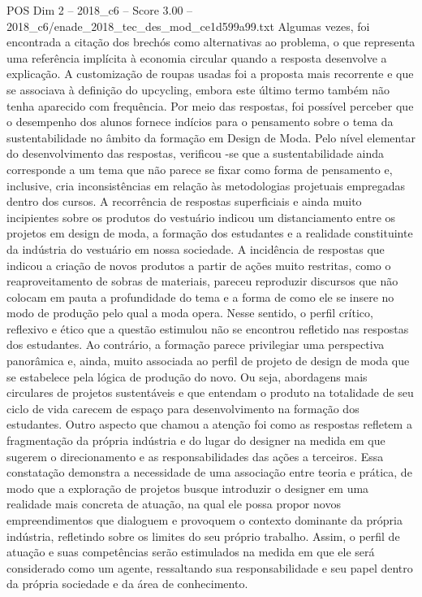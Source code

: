 \begin{textsample}{POS Dim 2 – 2018\_c6 – Score 3.00 – 2018\_c6/enade\_2018\_tec\_des\_mod\_ce1d599a99.txt}
Algumas vezes, foi encontrada a citação dos brechós como alternativas ao problema, o que representa uma referência implícita à economia circular quando a resposta desenvolve a explicação.
A customização de roupas usadas foi a proposta mais recorrente e que se associava à definição do upcycling, embora este último termo também não tenha aparecido com frequência.
Por meio das respostas, foi possível perceber que o desempenho dos alunos fornece indícios para o pensamento sobre o tema da sustentabilidade no âmbito da formação em Design de Moda.
Pelo nível elementar do desenvolvimento das respostas, verificou -se que a sustentabilidade ainda corresponde a um tema que não parece se fixar como forma de pensamento e, inclusive, cria inconsistências em relação às metodologias projetuais empregadas dentro dos cursos.
A recorrência de respostas superficiais e ainda muito incipientes sobre os produtos do vestuário indicou um distanciamento entre os projetos em design de moda, a formação dos estudantes e a realidade constituinte da indústria do vestuário em nossa sociedade.
A incidência de respostas que indicou a criação de novos produtos a partir de ações muito restritas, como o reaproveitamento de sobras de materiais, pareceu reproduzir discursos que não colocam em pauta a profundidade do tema e a forma de como ele se insere no modo de produção pelo qual a moda opera.
Nesse sentido, o perfil crítico, reflexivo e ético que a questão estimulou não se encontrou refletido nas respostas dos estudantes.
Ao contrário, a formação parece privilegiar uma perspectiva panorâmica e, ainda, muito associada ao perfil de projeto de design de moda que se estabelece pela lógica de produção do novo.
Ou seja, abordagens mais circulares de projetos sustentáveis e que entendam o produto na totalidade de seu ciclo de vida carecem de espaço para desenvolvimento na formação dos estudantes.
Outro aspecto que chamou a atenção foi como as respostas refletem a fragmentação da própria indústria e do lugar do designer na medida em que sugerem o direcionamento e as responsabilidades das ações a terceiros.
Essa constatação demonstra a necessidade de uma associação entre teoria e prática, de modo que a exploração de projetos busque introduzir o designer em uma realidade mais concreta de atuação, na qual ele possa propor novos empreendimentos que dialoguem e provoquem o contexto dominante da própria indústria, refletindo sobre os limites do seu próprio trabalho.
Assim, o perfil de atuação e suas competências serão estimulados na medida em que ele será considerado como um agente, ressaltando sua responsabilidade e seu papel dentro da própria sociedade e da área de conhecimento.

\end{textsample}
